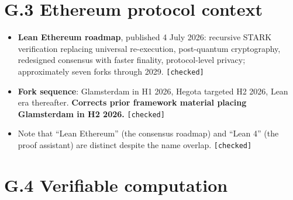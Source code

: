 \documentclass[
  11pt]{report}
\providecommand{\tightlist}{%
  \setlength{\itemsep}{0pt}\setlength{\parskip}{0pt}}
\begin{document}
\hypertarget{g.3-ethereum-protocol-context}{%
\section{G.3 Ethereum protocol
context}\label{g.3-ethereum-protocol-context}}

\begin{itemize}
\tightlist
\item
  \textbf{Lean Ethereum roadmap}, published 4 July 2026: recursive STARK
  verification replacing universal re-execution, post-quantum
  cryptography, redesigned consensus with faster finality,
  protocol-level privacy; approximately seven forks through 2029.
  \texttt{{[}checked{]}}
\item
  \textbf{Fork sequence}: Glamsterdam in H1 2026, Hegota targeted H2
  2026, Lean era thereafter. \textbf{Corrects prior framework material
  placing Glamsterdam in H2 2026.} \texttt{{[}checked{]}}
\item
  Note that ``Lean Ethereum'' (the consensus roadmap) and ``Lean 4''
  (the proof assistant) are distinct despite the name overlap.
  \texttt{{[}checked{]}}
\end{itemize}

\hypertarget{g.4-verifiable-computation}{%
\section{G.4 Verifiable computation}\label{g.4-verifiable-computation}}
\end{document}
